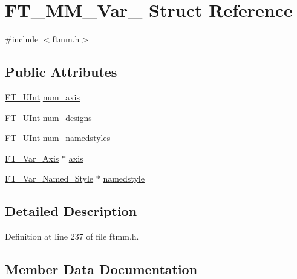 \hypertarget{struct_f_t___m_m___var__}{}\section{F\+T\+\_\+\+M\+M\+\_\+\+Var\+\_\+ Struct Reference}
\label{struct_f_t___m_m___var__}


{\ttfamily \#include $<$ftmm.\+h$>$}

\subsection*{Public Attributes}
\begin{DoxyCompactItemize}
\item 
\mbox{\hyperlink{fttypes_8h_abcb8db4dbf35d2b55a9e8c7b0926dc52}{F\+T\+\_\+\+U\+Int}} \mbox{\hyperlink{struct_f_t___m_m___var___acd32d4eb128f6fd9f6fde7da4c7b99bf}{num\+\_\+axis}}
\item 
\mbox{\hyperlink{fttypes_8h_abcb8db4dbf35d2b55a9e8c7b0926dc52}{F\+T\+\_\+\+U\+Int}} \mbox{\hyperlink{struct_f_t___m_m___var___a5109a6a20626d90ed44cd64363d29e92}{num\+\_\+designs}}
\item 
\mbox{\hyperlink{fttypes_8h_abcb8db4dbf35d2b55a9e8c7b0926dc52}{F\+T\+\_\+\+U\+Int}} \mbox{\hyperlink{struct_f_t___m_m___var___ac54bdd53447f4967b5d3b1a341a4bdff}{num\+\_\+namedstyles}}
\item 
\mbox{\hyperlink{ftmm_8h_a8b0e5ef119b710a0a4e09c759effe038}{F\+T\+\_\+\+Var\+\_\+\+Axis}} $\ast$ \mbox{\hyperlink{struct_f_t___m_m___var___a19cc7772e057dad1c4acd6e744328466}{axis}}
\item 
\mbox{\hyperlink{ftmm_8h_a0e14db2af2621f16b9446ce0dd7734a1}{F\+T\+\_\+\+Var\+\_\+\+Named\+\_\+\+Style}} $\ast$ \mbox{\hyperlink{struct_f_t___m_m___var___acda1ec5211250ddc06ec090f695adabf}{namedstyle}}
\end{DoxyCompactItemize}


\subsection{Detailed Description}


Definition at line 237 of file ftmm.\+h.



\subsection{Member Data Documentation}
\mbox{\label{struct_f_t___m_m___var___a19cc7772e057dad1c4acd6e744328466}} 
